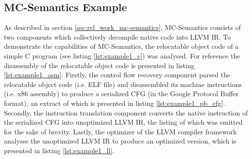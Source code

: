 
\subsection{MC-Semantics Example}
\label{app:mc-semantics_example}

As described in section \ref{sec:rel_work_mc-semantics}, MC-Semantics consists of two components which collectively decompile native code into LLVM IR. To demonstrate the capabilities of MC-Semantics, the relocatable object code of a simple C program (see listing \ref{lst:example1_c}) was analysed. For reference the disassembly of the relocatable object code is presented in listing \ref{lst:example1_asm}. Firstly, the control flow recovery component parsed the relocatable object code (i.e. ELF file) and disassembled its machine instructions (i.e. x86 assembly) to produce a serialized CFG (in the Google Protocol Buffer format), an extract of which is presented in listing \ref{lst:example1_pb_cfg}. Secondly, the instruction translation component converts the native instruction of the serialized CFG into unoptimized LLVM IR, the listing of which was emitted for the sake of brevity. Lastly, the optimizer of the LLVM compiler framework analyses the unoptimized LLVM IR to produce an optimized version, which is presented in listing \ref{lst:example1_ll}.






